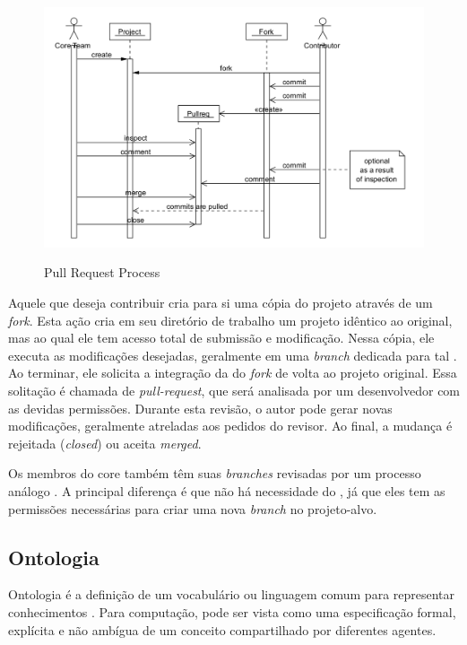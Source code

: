 \documentclass[sigconf]{acmart}
\begin{document}
   \begin{figure}[!htbp]
    \includegraphics[width=\columnwidth]{pull-request-flow}\label{fig:pull-request-flow}
    \caption{Pull Request Process \cite{gousios2014}}
  \end{figure}

  Aquele que deseja contribuir cria para si uma cópia do projeto através de um \textit{fork}. Esta ação cria em seu diretório de trabalho um projeto idêntico ao original, mas ao qual ele tem acesso total de submissão e modificação. Nessa cópia, ele executa as modificações desejadas, geralmente em uma \textit{branch} dedicada para tal \cite{gousios2016}. Ao terminar, ele solicita a integração da  do \textit{fork} de volta ao projeto original. Essa solitação é chamada de \textit{pull-request}, que será analisada por um desenvolvedor com as devidas permissões. Durante esta revisão, o autor pode gerar novas modificações, geralmente atreladas aos pedidos do revisor. Ao final, a mudança é rejeitada (\textit{closed}) ou aceita \textit{merged}.

  Os membros do core também têm suas \textit{branches} revisadas por um processo análogo \cite{6385140,Bosu2014}. A principal diferença é que não há necessidade do , já que eles tem as permissões necessárias para criar uma nova \textit{branch} no projeto-alvo.

\subsection{Ontologia}

Ontologia é a definição de um vocabulário ou linguagem comum para representar conhecimentos \cite{guarino1998}. Para computação, pode ser vista como uma especificação formal, explícita e não ambígua de um conceito compartilhado por diferentes agentes.
\end{document}

